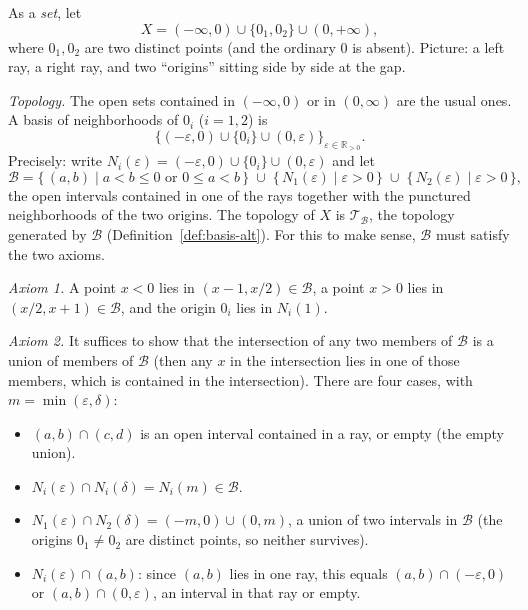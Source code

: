 \documentclass[11pt]{report}
\makeatletter
\newcounter{excounter}[section]
\newcommand{\exlabel}[1]{\edef\@currentlabel{\arabic{section}.\arabic{excounter}}\label{#1}}
\makeatother
\begin{document}
\begin{exbox}\exlabel{ex:two-origins}
As a \emph{set}, let
\[
X = (-\infty, 0) \cup \{0_1, 0_2\} \cup (0, +\infty),
\]
where $0_1, 0_2$ are two distinct points (and the ordinary $0$ is absent). Picture: a left ray, a right ray, and two ``origins'' sitting side by side at the gap.

\textit{Topology.} The open sets contained in $(-\infty, 0)$ or in $(0, \infty)$ are the usual ones. A basis of neighborhoods of $0_i$ ($i = 1, 2$) is
\[
\big\{ (-\varepsilon, 0) \cup \{0_i\} \cup (0, \varepsilon) \big\}_{\varepsilon \in \mathbb{R}_{>0}}.
\]
Precisely: write $N_i(\varepsilon) = (-\varepsilon, 0) \cup \{0_i\} \cup (0, \varepsilon)$ and let
\[
\mathcal{B} = \{\, (a,b) \mid a < b \le 0 \text{ or } 0 \le a < b \,\} \;\cup\; \{\, N_1(\varepsilon) \mid \varepsilon > 0 \,\} \;\cup\; \{\, N_2(\varepsilon) \mid \varepsilon > 0 \,\},
\]
the open intervals contained in one of the rays together with the punctured neighborhoods of the two origins. The topology of $X$ is $\mathcal{T}_{\mathcal{B}}$, the topology generated by $\mathcal{B}$ (Definition~\ref{def:basis-alt}). For this to make sense, $\mathcal{B}$ must satisfy the two axioms.

\emph{Axiom 1.} A point $x < 0$ lies in $(x - 1, x/2) \in \mathcal{B}$, a point $x > 0$ lies in $(x/2, x + 1) \in \mathcal{B}$, and the origin $0_i$ lies in $N_i(1)$.

\emph{Axiom 2.} It suffices to show that the intersection of any two members of $\mathcal{B}$ is a union of members of $\mathcal{B}$ (then any $x$ in the intersection lies in one of those members, which is contained in the intersection). There are four cases, with $m = \min(\varepsilon, \delta)$:
\begin{itemize}
    \item $(a,b) \cap (c,d)$ is an open interval contained in a ray, or empty (the empty union).
    \item $N_i(\varepsilon) \cap N_i(\delta) = N_i(m) \in \mathcal{B}$.
    \item $N_1(\varepsilon) \cap N_2(\delta) = (-m, 0) \cup (0, m)$, a union of two intervals in $\mathcal{B}$ (the origins $0_1 \neq 0_2$ are distinct points, so neither survives).
    \item $N_i(\varepsilon) \cap (a,b)$: since $(a,b)$ lies in one ray, this equals $(a,b) \cap (-\varepsilon, 0)$ or $(a,b) \cap (0, \varepsilon)$, an interval in that ray or empty.
\end{itemize}


\end{exbox}
\end{document}
